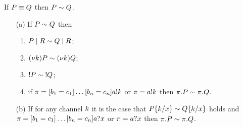 

\begin{proposition}\label{prop:Cpi-bisim-standard-props}
If $P\equiv Q$ then $P\sim Q$.
\end{proposition}

 
\begin{proposition}\label{prop:Cpi_bisim_congruence}
\leavevmode
\begin{itemize}
\item [(a)] If $P\sim Q$ then
\begin{enumerate}
\item $P\;|\;R\sim Q\;|\;R$;
\item $(\nu k)P\sim(\nu k)Q$;
\item $! P\sim\;! Q$;
\item if $\pi=[ b_1 = c_1 ]\ldots[ b_n = c_n ]a!k$ or $\pi=a!k$ then $\pi.P\sim\pi.Q$.
\end{enumerate}
\item [(b)] If for any channel $k$ it is the case that $P\{k/x\}\sim Q\{k/x\}$ holds  and $\pi=[ b_1 = c_1 ]\ldots[ b_n = c_n ]a?x$ or $\pi=a?x$ then $\pi.P\sim\pi.Q$.
\end{itemize}
\end{proposition}



